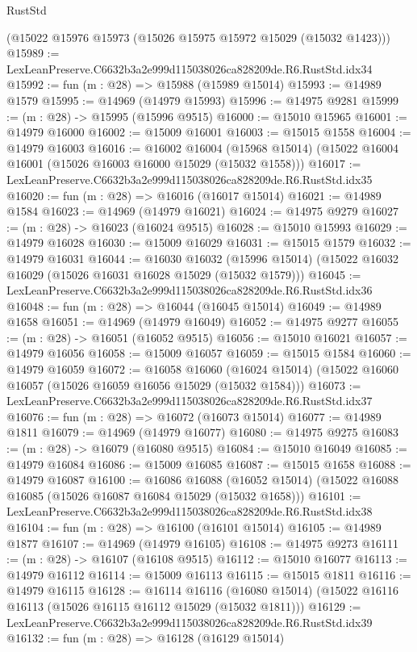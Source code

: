 \begin{lexlean}{RustStd}
\begin{coremodule}
    (@15022 @15976 @15973 (@15026 @15975 @15972 @15029 (@15032 @1423)))
@15989 := LexLeanPreserve.C6632b3a2e999d115038026ca828209de.R6.RustStd.idx34
@15992 := fun (m : @28) => @15988 (@15989 @15014)
@15993 := @14989 @1579
@15995 := @14969 (@14979 @15993)
@15996 := @14975 @9281
@15999 := (m : @28) -> @15995 (@15996 @9515)
@16000 := @15010 @15965
@16001 := @14979 @16000
@16002 := @15009 @16001
@16003 := @15015 @1558
@16004 := @14979 @16003
@16016 := @16002
    @16004
    (@15968 @15014)
    (@15022 @16004 @16001 (@15026 @16003 @16000 @15029 (@15032 @1558)))
@16017 := LexLeanPreserve.C6632b3a2e999d115038026ca828209de.R6.RustStd.idx35
@16020 := fun (m : @28) => @16016 (@16017 @15014)
@16021 := @14989 @1584
@16023 := @14969 (@14979 @16021)
@16024 := @14975 @9279
@16027 := (m : @28) -> @16023 (@16024 @9515)
@16028 := @15010 @15993
@16029 := @14979 @16028
@16030 := @15009 @16029
@16031 := @15015 @1579
@16032 := @14979 @16031
@16044 := @16030
    @16032
    (@15996 @15014)
    (@15022 @16032 @16029 (@15026 @16031 @16028 @15029 (@15032 @1579)))
@16045 := LexLeanPreserve.C6632b3a2e999d115038026ca828209de.R6.RustStd.idx36
@16048 := fun (m : @28) => @16044 (@16045 @15014)
@16049 := @14989 @1658
@16051 := @14969 (@14979 @16049)
@16052 := @14975 @9277
@16055 := (m : @28) -> @16051 (@16052 @9515)
@16056 := @15010 @16021
@16057 := @14979 @16056
@16058 := @15009 @16057
@16059 := @15015 @1584
@16060 := @14979 @16059
@16072 := @16058
    @16060
    (@16024 @15014)
    (@15022 @16060 @16057 (@15026 @16059 @16056 @15029 (@15032 @1584)))
@16073 := LexLeanPreserve.C6632b3a2e999d115038026ca828209de.R6.RustStd.idx37
@16076 := fun (m : @28) => @16072 (@16073 @15014)
@16077 := @14989 @1811
@16079 := @14969 (@14979 @16077)
@16080 := @14975 @9275
@16083 := (m : @28) -> @16079 (@16080 @9515)
@16084 := @15010 @16049
@16085 := @14979 @16084
@16086 := @15009 @16085
@16087 := @15015 @1658
@16088 := @14979 @16087
@16100 := @16086
    @16088
    (@16052 @15014)
    (@15022 @16088 @16085 (@15026 @16087 @16084 @15029 (@15032 @1658)))
@16101 := LexLeanPreserve.C6632b3a2e999d115038026ca828209de.R6.RustStd.idx38
@16104 := fun (m : @28) => @16100 (@16101 @15014)
@16105 := @14989 @1877
@16107 := @14969 (@14979 @16105)
@16108 := @14975 @9273
@16111 := (m : @28) -> @16107 (@16108 @9515)
@16112 := @15010 @16077
@16113 := @14979 @16112
@16114 := @15009 @16113
@16115 := @15015 @1811
@16116 := @14979 @16115
@16128 := @16114
    @16116
    (@16080 @15014)
    (@15022 @16116 @16113 (@15026 @16115 @16112 @15029 (@15032 @1811)))
@16129 := LexLeanPreserve.C6632b3a2e999d115038026ca828209de.R6.RustStd.idx39
@16132 := fun (m : @28) => @16128 (@16129 @15014)

\end{coremodule}
\end{lexlean}

